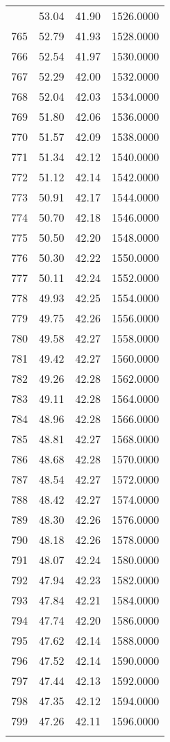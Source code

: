 \documentclass[
  captions=tableheading,
]{scrartcl}
\begin{document}
\begin{longtable} {l|l|l|l}
{764	& 53.04	& 41.90	& 1526.0000\\
765	& 52.79	& 41.93	& 1528.0000\\
766	& 52.54	& 41.97	& 1530.0000\\
767	& 52.29	& 42.00	& 1532.0000\\
768	& 52.04	& 42.03	& 1534.0000\\
769	& 51.80	& 42.06	& 1536.0000\\
770	& 51.57	& 42.09	& 1538.0000\\
771	& 51.34	& 42.12	& 1540.0000\\
772	& 51.12	& 42.14	& 1542.0000\\
773	& 50.91	& 42.17	& 1544.0000\\
774	& 50.70	& 42.18	& 1546.0000\\
775	& 50.50	& 42.20	& 1548.0000\\
776	& 50.30	& 42.22	& 1550.0000\\
777	& 50.11	& 42.24	& 1552.0000\\
778	& 49.93	& 42.25	& 1554.0000\\
779	& 49.75	& 42.26	& 1556.0000\\
780	& 49.58	& 42.27	& 1558.0000\\
781	& 49.42	& 42.27	& 1560.0000\\
782	& 49.26	& 42.28	& 1562.0000\\
783	& 49.11	& 42.28	& 1564.0000\\
784	& 48.96	& 42.28	& 1566.0000\\
785	& 48.81	& 42.27	& 1568.0000\\
786	& 48.68	& 42.28	& 1570.0000\\
787	& 48.54	& 42.27	& 1572.0000\\
788	& 48.42	& 42.27	& 1574.0000\\
789	& 48.30	& 42.26	& 1576.0000\\
790	& 48.18	& 42.26	& 1578.0000\\
791	& 48.07	& 42.24	& 1580.0000\\
792	& 47.94	& 42.23	& 1582.0000\\
793	& 47.84	& 42.21	& 1584.0000\\
794	& 47.74	& 42.20	& 1586.0000\\
795	& 47.62	& 42.14	& 1588.0000\\
796	& 47.52	& 42.14	& 1590.0000\\
797	& 47.44	& 42.13	& 1592.0000\\
798	& 47.35	& 42.12	& 1594.0000\\
799	& 47.26	& 42.11	& 1596.0000\\
}
\end{longtable}
\end{document}
